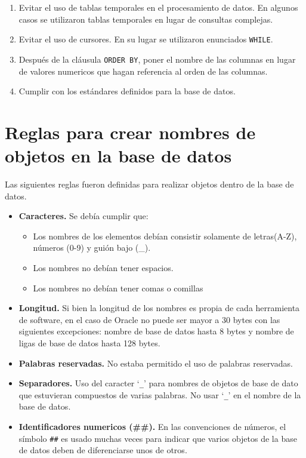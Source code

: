 \begin{enumerate}
\item Evitar el uso de tablas temporales en el procesamiento de datos. En
  algunos casos se utilizaron tablas temporales en lugar de consultas complejas.

\item Evitar el uso de cursores. En su lugar se utilizaron enunciados
  \texttt{WHILE}.

\item Después de la cláusula \texttt{ORDER BY}, poner el nombre de las columnas
  en lugar de valores numericos que hagan referencia al orden de las columnas.

\item Cumplir con los estándares definidos para la base de datos.

\end{enumerate}

\section{Reglas para crear nombres de objetos en la base de datos}

Las siguientes reglas fueron definidas para realizar objetos dentro de la base
de datos.

\begin{itemize}

\item \textbf{Caracteres.} Se debía cumplir que:

  \begin{itemize}
  \item Los nombres de los elementos debían consistir solamente de letras(A-Z),
    números (0-9) y guión bajo (\_).
  \item Los nombres no debían tener espacios.
  \item Los nombres no debían tener comas o comillas
  \end{itemize}

\item \textbf{Longitud.} Si bien la longitud de los nombres es propia de cada
  herramienta de software, en el caso de Oracle no puede ser mayor a 30 bytes
  con las siguientes excepciones: nombre de base de datos hasta 8 bytes y nombre
  de ligas de base de datos hasta 128 bytes.

\item \textbf{Palabras reservadas.} No estaba permitido el uso de palabras
  reservadas.

\item \textbf{Separadores.} Uso del caracter `\texttt{\_}' para nombres de
  objetos de base de dato que estuvieran compuestos de varias palabras. No usar
  `\texttt{\_}' en el nombre de la base de datos.

\item \textbf{Identificadores numericos (\#\#).} En las convenciones de números,
  el símbolo \texttt{\#\#} es usado muchas veces para indicar que varios objetos
  de la base de datos deben de diferenciarse unos de otros.

\end{itemize}

